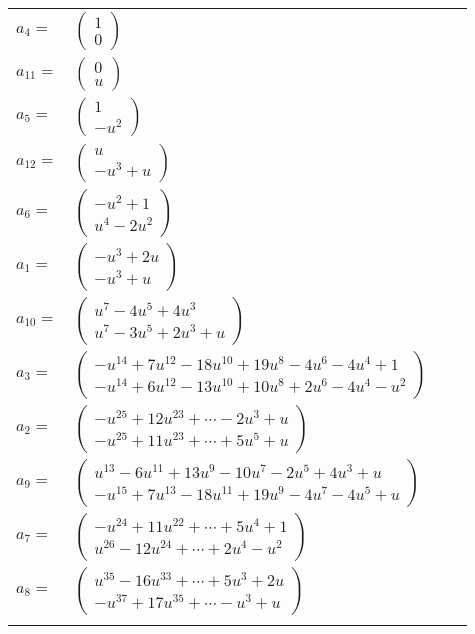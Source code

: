 \documentclass[1p]{elsarticle_modified}
\theoremstyle{definition}
\begin{document}
\begin{tabular}{m{7pt} m{180pt} m{7pt} m{180pt} }
\flushright $a_{4}=$&$\begin{pmatrix}1\\0\end{pmatrix}$ \\
\flushright $a_{11}=$&$\begin{pmatrix}0\\u\end{pmatrix}$ \\
\flushright $a_{5}=$&$\begin{pmatrix}1\\- u^2\end{pmatrix}$ \\
\flushright $a_{12}=$&$\begin{pmatrix}u\\- u^3+u\end{pmatrix}$ \\
\flushright $a_{6}=$&$\begin{pmatrix}- u^2+1\\u^4-2 u^2\end{pmatrix}$ \\
\flushright $a_{1}=$&$\begin{pmatrix}- u^3+2 u\\- u^3+u\end{pmatrix}$ \\
\flushright $a_{10}=$&$\begin{pmatrix}u^7-4 u^5+4 u^3\\u^7-3 u^5+2 u^3+u\end{pmatrix}$ \\
\flushright $a_{3}=$&$\begin{pmatrix}- u^{14}+7 u^{12}-18 u^{10}+19 u^8-4 u^6-4 u^4+1\\- u^{14}+6 u^{12}-13 u^{10}+10 u^8+2 u^6-4 u^4- u^2\end{pmatrix}$ \\
\flushright $a_{2}=$&$\begin{pmatrix}- u^{25}+12 u^{23}+\cdots-2 u^3+u\\- u^{25}+11 u^{23}+\cdots+5 u^5+u\end{pmatrix}$ \\
\flushright $a_{9}=$&$\begin{pmatrix}u^{13}-6 u^{11}+13 u^9-10 u^7-2 u^5+4 u^3+u\\- u^{15}+7 u^{13}-18 u^{11}+19 u^9-4 u^7-4 u^5+u\end{pmatrix}$ \\
\flushright $a_{7}=$&$\begin{pmatrix}- u^{24}+11 u^{22}+\cdots+5 u^4+1\\u^{26}-12 u^{24}+\cdots+2 u^4- u^2\end{pmatrix}$ \\
\flushright $a_{8}=$&$\begin{pmatrix}u^{35}-16 u^{33}+\cdots+5 u^3+2 u\\- u^{37}+17 u^{35}+\cdots- u^3+u\end{pmatrix}$\\&\end{tabular}
\end{document}
